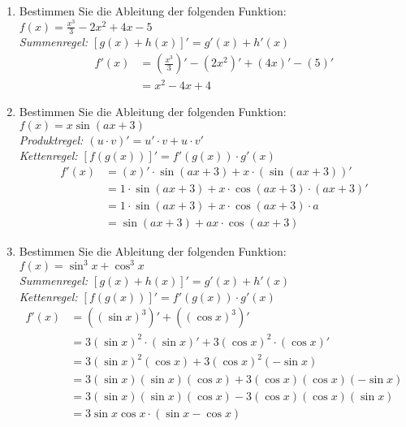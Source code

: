 \documentclass[12pt]{article}
\begin{document}

\noindent
\begin{enumerate}[start=1,label={\bfseries Frage \arabic*:},leftmargin=1in] 

    \item Bestimmen Sie die Ableitung der folgenden Funktion: $f(x)=\frac{x^3}{3}-{2x^2}+4x-5$ \\
    \textit{Summenregel: $[g(x )+ h(x)]' = g'(x) + h'(x)$} \\
    \begin{align*}
        f'(x)&=(\frac{x^3}{3})'-(2x^2)'+(4x)'-(5)' \\
        &= {x^2}-4x+4\
    \end{align*}

    \item Bestimmen Sie die Ableitung der folgenden Funktion: $f(x)=x\sin{(ax+3)}$ \\
    \textit{Produktregel: $(u \cdot v)' = u' \cdot v + u \cdot v'$} \\
    \textit{Kettenregel: $[f(g(x))]'=f'(g(x)) \cdot g'(x)$}
    \begin{align*}
        f'(x)&=(x)' \cdot \sin({ax+3}) + x \cdot (\sin({ax+3}))' \\
        &= 1 \cdot \sin{(ax+3)} + x \cdot \cos{(ax+3)} \cdot (ax+3)' \\
        &= 1 \cdot \sin{(ax+3)} + x \cdot \cos{(ax+3)} \cdot a \\
        &= \sin{(ax+3)} + ax \cdot \cos{(ax+3)}
    \end{align*}

    \item Bestimmen Sie die Ableitung der folgenden Funktion: $f(x)=\sin^3{x} + \cos^3{x}$ \\
    \textit{Summenregel: $[g(x )+ h(x)]' = g'(x) + h'(x)$} \\
    \textit{Kettenregel: $[f(g(x))]'=f'(g(x)) \cdot g'(x)$}
    \begin{align*}
        f'(x)&=((\sin{x})^3)' + ((\cos{x})^3)' \\
        &= 3(\sin{x})^2 \cdot (\sin{x})' + 3(\cos{x})^2 \cdot (\cos{x})' \\
        &= 3(\sin{x})^2 (\cos{x}) + 3(\cos{x})^2 (-\sin{x}) \\
        &= 3(\sin{x})(\sin{x})(\cos{x}) + 3(\cos{x})(\cos{x})(-\sin{x}) \\
        &= 3(\sin{x})(\sin{x})(\cos{x}) - 3(\cos{x})(\cos{x})(\sin{x}) \\
        &= 3\sin{x}\cos{x} \cdot (\sin{x} - \cos{x})
    \end{align*}


\end{enumerate}
\end{document}
